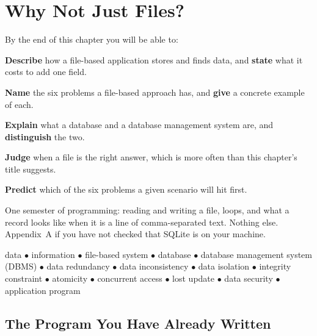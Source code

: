 \chapter{Why Not Just Files?}\label{ch:whynotfiles}

\begin{outcomes}
By the end of this chapter you will be able to:
\begin{tight}
  \item \textbf{Describe} how a file-based application stores and finds data,
        and \textbf{state} what it costs to add one field.
  \item \textbf{Name} the six problems a file-based approach has, and
        \textbf{give} a concrete example of each.
  \item \textbf{Explain} what a database and a database management system are,
        and \textbf{distinguish} the two.
  \item \textbf{Judge} when a file is the right answer, which is more often
        than this chapter's title suggests.
  \item \textbf{Predict} which of the six problems a given scenario will hit
        first.
\end{tight}
\end{outcomes}

\begin{prereq}
One semester of programming: reading and writing a file, loops, and what a
record looks like when it is a line of comma-separated text. Nothing else.
Appendix~A if you have not checked that SQLite is on your machine.
\end{prereq}

\begin{keyterms}
data $\bullet$ information $\bullet$ file-based system $\bullet$ database
$\bullet$ database management system (DBMS) $\bullet$ data redundancy
$\bullet$ data inconsistency $\bullet$ data isolation $\bullet$ integrity
constraint $\bullet$ atomicity $\bullet$ concurrent access $\bullet$ lost
update $\bullet$ data security $\bullet$ application program
\end{keyterms}

\section{The Program You Have Already Written}

